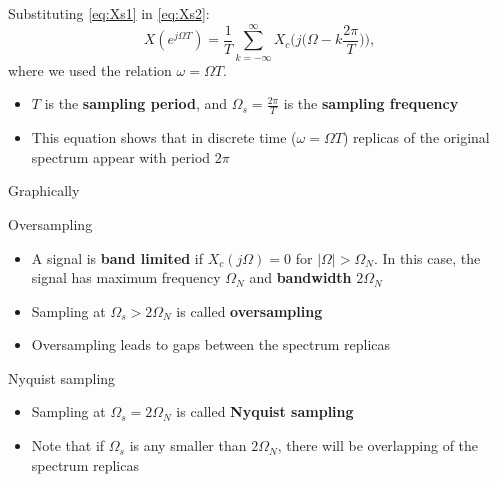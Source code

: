\documentclass[10pt, aspectratio=169]{beamer}
\begin{document}
%
\begin{frame}
Substituting \eqref{eq:Xs1} in \eqref{eq:Xs2}:
\begin{equation*}
X(e^{j\Omega T}) = \frac{1}{T}\sum_{k=-\infty}^{\infty} X_c\Big(j\Big(\Omega - k\frac{2\pi}{T}\Big)\Big),
\end{equation*}
where we used the relation $\omega = \Omega T$.

\begin{itemize}
	\item $T$ is the \textbf{sampling period}, and $\Omega_s = \frac{2\pi}{T}$ is the \textbf{sampling frequency}
	\item This equation shows that in discrete time ($\omega = \Omega T$) replicas of the original spectrum appear with period $2\pi$
\end{itemize}

\end{frame}

\begin{frame}{Graphically}
\vspace{-0.4cm}
\begin{center}
	\resizebox{0.7\linewidth}{!}{}
\end{center}
\vspace{-0.4cm}
\end{frame}

\begin{frame}{Oversampling}
\begin{itemize}
	\item A signal is \textbf{band limited} if $X_c(j\Omega) = 0$ for $|\Omega| > \Omega_N$. In this case, the signal has maximum frequency $\Omega_N$ and \textbf{bandwidth} $2\Omega_N$
	\item Sampling at $\Omega_s > 2\Omega_N$ is called \textbf{oversampling}
	\item Oversampling leads to gaps between the spectrum replicas
\end{itemize}

\begin{center}
\end{center}
\end{frame}

\begin{frame}{Nyquist sampling}
\begin{itemize}
	\item Sampling at $\Omega_s = 2\Omega_N$ is called \textbf{Nyquist sampling}
	\item Note that if $\Omega_s$ is any smaller than $2\Omega_N$, there will be overlapping of the spectrum replicas
	
\begin{center}
\end{center}
\end{itemize}
\end{frame}
\end{document}
